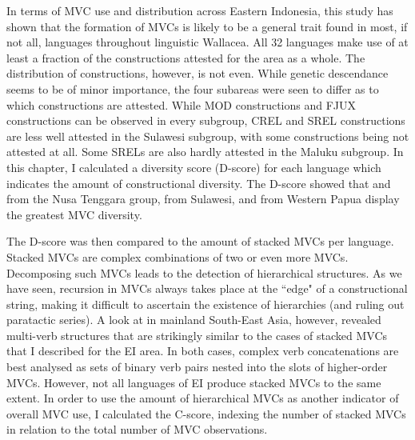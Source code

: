 In terms of MVC use and distribution across Eastern Indonesia, this study has shown that the formation of MVCs is likely to be a general trait found in most, if not all, languages throughout linguistic Wallacea. All 32 languages make use of at least a fraction of the constructions attested for the area as a whole. The distribution of constructions, however, is not even. While genetic descendance seems to be of minor importance, the four subareas were seen to differ as to which constructions are attested. While MOD constructions and FJUX constructions can be observed in every subgroup, CREL and SREL constructions are less well attested in the Sulawesi subgroup, with some constructions being not attested at all. Some SRELs are also hardly attested in the Maluku subgroup. In this chapter, I calculated a diversity score (D-score) for each language which indicates the amount of constructional diversity. The D-score showed that  and  from the Nusa Tenggara group,  from Sulawesi, and  from Western Papua display the greatest MVC diversity. 

The D-score was then compared to the amount of stacked MVCs per language. Stacked MVCs are complex combinations of two or even more MVCs. Decomposing such MVCs leads to the detection of hierarchical structures. As we have seen, recursion in MVCs always takes place at the ``edge" of a constructional string, making it difficult to ascertain the existence of hierarchies (and ruling out paratactic series). A look at  in mainland South-East Asia, however, revealed multi-verb structures that are strikingly similar to the cases of stacked MVCs that I described for the EI area. In both cases, complex verb concatenations are best analysed as sets of binary verb pairs nested into the slots of higher-order MVCs. However, not all languages of EI produce stacked MVCs to the same extent. In order to use the amount of hierarchical MVCs as another indicator of overall MVC use, I calculated the C-score, indexing the number of stacked MVCs in relation to the total number of MVC observations.

